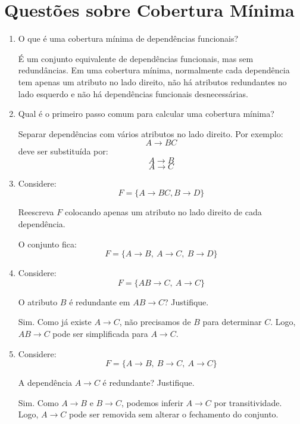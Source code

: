 \documentclass[12pt,a4paper]{article}
\begin{document}
\section{Questões sobre Cobertura Mínima}

\begin{enumerate}[resume,label=\textbf{Q\arabic*.}]

\item O que é uma cobertura mínima de dependências funcionais?

\begin{resposta}
É um conjunto equivalente de dependências funcionais, mas sem redundâncias. Em uma cobertura mínima, normalmente cada dependência tem apenas um atributo no lado direito, não há atributos redundantes no lado esquerdo e não há dependências funcionais desnecessárias.
\end{resposta}

\item Qual é o primeiro passo comum para calcular uma cobertura mínima?

\begin{resposta}
Separar dependências com vários atributos no lado direito. Por exemplo:
\[
A \rightarrow BC
\]
deve ser substituída por:
\[
A \rightarrow B
\]
\[
A \rightarrow C
\]
\end{resposta}

\item Considere:
\[
F = \{A \rightarrow BC, B \rightarrow D\}
\]

Reescreva $F$ colocando apenas um atributo no lado direito de cada dependência.

\begin{resposta}
O conjunto fica:
\[
F = \{A \rightarrow B,\ A \rightarrow C,\ B \rightarrow D\}
\]
\end{resposta}

\item Considere:
\[
F = \{AB \rightarrow C,\ A \rightarrow C\}
\]

O atributo $B$ é redundante em $AB \rightarrow C$? Justifique.

\begin{resposta}
Sim. Como já existe $A \rightarrow C$, não precisamos de $B$ para determinar $C$. Logo, $AB \rightarrow C$ pode ser simplificada para $A \rightarrow C$.
\end{resposta}

\item Considere:
\[
F = \{A \rightarrow B,\ B \rightarrow C,\ A \rightarrow C\}
\]

A dependência $A \rightarrow C$ é redundante? Justifique.

\begin{resposta}
Sim. Como $A \rightarrow B$ e $B \rightarrow C$, podemos inferir $A \rightarrow C$ por transitividade. Logo, $A \rightarrow C$ pode ser removida sem alterar o fechamento do conjunto.
\end{resposta}

\end{enumerate}
\end{document}
